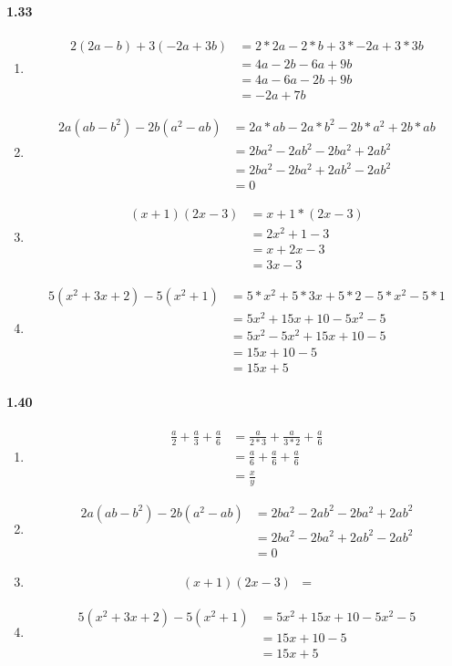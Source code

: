 \documentclass{article}
\newcommand\litem[1]{\item{\bfseries#1\space}}
\begin{document}
\paragraph{1.33}
\begin{enumerate}[label=\emph{\alph*})]
\litem{
\begin{align*}
  2(2a - b) + 3(-2a + 3b) &= 2 * 2a - 2 * b + 3 * -2a + 3 * 3b \\
  &= 4a - 2b - 6a + 9b \\
  &= 4a - 6a - 2b + 9b \\
  &= -2a + 7b
\end{align*}
}
\litem{
\begin{align*}
  2a(ab - b^2) - 2b(a^2 - ab) &= 2a * ab - 2a * b^2 - 2b * a^2 + 2b * ab \\
  &= 2ba^2 - 2ab^2 - 2ba^2 + 2ab^2 \\
  &= 2ba^2 - 2ba^2 + 2ab^2 - 2ab^2 \\
  &= 0
\end{align*}
}
\litem{
\begin{align*}
  (x + 1)(2x - 3) &= x + 1 * (2x - 3) \\
  &= 2x^2 + 1 - 3 \\
  &= x + 2x - 3 \\
  &= 3x - 3
\end{align*}
}
\litem{
\begin{align*}
  5(x^2 + 3x + 2) - 5(x^2 + 1) &= 5 * x^2 + 5 * 3x + 5 * 2 - 5 * x^2 - 5 * 1 \\
  &= 5x^2 + 15x + 10 - 5x^2 - 5 \\
  &= 5x^2 - 5x^2 + 15x + 10 - 5 \\
  &= 15x + 10 - 5 \\
  &= 15x + 5
\end{align*}
}
\end{enumerate}

\paragraph{1.40}
\begin{enumerate}[label=\emph{\alph*})]
\litem{
\begin{align*}
  \frac{a}{2} + \frac{a}{3} + \frac{a}{6} &= \frac{a}{2*3} + \frac{a}{3*2} + \frac{a}{6} \\
  &= \frac{a}{6} + \frac{a}{6} + \frac{a}{6} \\
  &= \frac{x}{y}
\end{align*}
}
\litem{
\begin{align*}
  2a(ab - b^2) - 2b(a^2 - ab) &= 2ba^2 - 2ab^2 - 2ba^2 + 2ab^2 \\
  &= 2ba^2 - 2ba^2 + 2ab^2 - 2ab^2 \\
  &= 0
\end{align*}
}
\litem{
\begin{align*}
  (x + 1)(2x - 3) &= 
\end{align*}
}
\litem{
\begin{align*}
  5(x^2 + 3x + 2) - 5(x^2 + 1) &= 5x^2 + 15x + 10 - 5x^2 - 5 \\
  &= 15x + 10 - 5 \\
  &= 15x + 5
\end{align*}
}
\end{enumerate}
\end{document}
